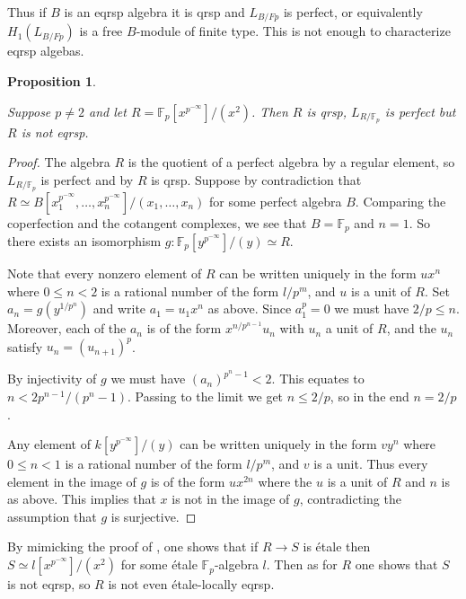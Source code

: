 \documentclass[11pt]{article}
\theoremstyle{plain}
\newtheorem{Prop}[Thm]{Proposition}
\theoremstyle{definition}
\theoremstyle{remark}
\numberwithin{equation}{section}
\newenvironment{propos}[1]%
    { \begin{Prop} \label{P:#1}}%
    { \end{Prop} }
\newcommand{\prop}[1]{\begin{propos}{#1}\sl }
\newcommand{\eprop}{\end{propos}}
\newcommand{\prf}{ \begin{proof} }
\newcommand{\epr}{ \end{proof} }
\newcommand\pmeninf{p^{-\infty}}
\newcommand{\Fp}{\mathbb{F}_p}
\begin{document}
Thus if $B$ is an eqrsp algebra it is qrsp and $L_{B/Fp}$ is perfect, or equivalently $H_{1}(L_{B/Fp})$ is a free $B$-module of finite type. This is not enough to characterize eqrsp algebas.

\prop{}

Suppose $p\ne2$ and let $R=\Fp[x^{\pmeninf}]/(x^2)$. Then $R$ is qrsp, $L_{R/\Fp}$ is perfect but $R$ is not eqrsp.

\eprop

\prf
The algebra $R$ is the quotient of a perfect algebra by a regular element, so $L_{R/\Fp}$ is perfect and by  $R$ is qrsp. Suppose by contradiction that $R\simeq B[x_1^{\pmeninf},\dots,x_n^{\pmeninf}]/(x_1,\dots,x_n)$ for some perfect algebra $B$. Comparing the coperfection and the cotangent complexes, we see that $B=\Fp$ and $n=1$. So there exists an isomorphism $g:\Fp[y^{\pmeninf}]/(y)\simeq R$.

Note that every nonzero element of $R$ can be written uniquely in the form $ux^{n}$ where $0\le n<2$ is a rational number of the form $l/p^m$, and $u$ is a unit of $R$. Set $a_n=g(y^{1/p^n})$ and write $a_1=u_1x^{n}$ as above. Since $a_1^p=0$ we must have $2/p\le n$. Moreover, each of the $a_n$ is of the form $x^{n/p^{n-1}}u_n$ with $u_n$ a unit of $R$, and the $u_n$ satisfy $u_n=(u_{n+1})^p$. 

By injectivity of $g$ we must have $(a_n)^{p^n-1}<2$. This equates to $n<2p^{n-1}/(p^{n}-1)$. Passing to the limit we get $n\le2/p$, so in the end $n=2/p$.

Any element of $k[y^{\pmeninf}]/(y)$ can be written uniquely in the form $vy^{n}$ where $0\le n<1$ is a rational number of the form $l/p^m$, and $v$ is a unit. Thus every element in the image of $g$ is of the form $ux^{2n}$ where the $u$ is a unit of $R$ and $n$ is as above. This implies that $x$ is not in the image of $g$, contradicting the assumption that $g$ is surjective. 

\epr

By mimicking the proof of , one shows that if $R\to S$ is étale then $S\simeq l[x^{\pmeninf}]/(x^2)$ for some étale $\Fp$-algebra $l$. Then as for $R$ one shows that $S$ is not eqrsp, so $R$ is not even étale-locally eqrsp.

\end{document}
